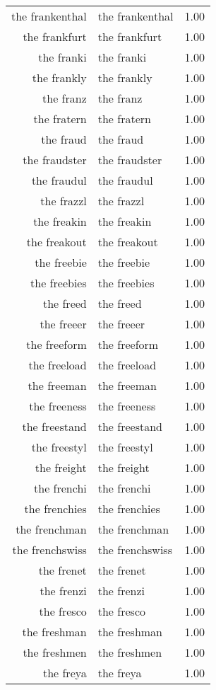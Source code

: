\begin{table}[ht]
\begin{tabular}{rlr}
  the frankenthal & the frankenthal & 1.00 \\ 
  the frankfurt & the frankfurt & 1.00 \\ 
  the franki & the franki & 1.00 \\ 
  the frankly & the frankly & 1.00 \\ 
  the franz & the franz & 1.00 \\ 
  the fratern & the fratern & 1.00 \\ 
  the fraud & the fraud & 1.00 \\ 
  the fraudster & the fraudster & 1.00 \\ 
  the fraudul & the fraudul & 1.00 \\ 
  the frazzl & the frazzl & 1.00 \\ 
  the freakin & the freakin & 1.00 \\ 
  the freakout & the freakout & 1.00 \\ 
  the freebie & the freebie & 1.00 \\ 
  the freebies & the freebies & 1.00 \\ 
  the freed & the freed & 1.00 \\ 
  the freeer & the freeer & 1.00 \\ 
  the freeform & the freeform & 1.00 \\ 
  the freeload & the freeload & 1.00 \\ 
  the freeman & the freeman & 1.00 \\ 
  the freeness & the freeness & 1.00 \\ 
  the freestand & the freestand & 1.00 \\ 
  the freestyl & the freestyl & 1.00 \\ 
  the freight & the freight & 1.00 \\ 
  the frenchi & the frenchi & 1.00 \\ 
  the frenchies & the frenchies & 1.00 \\ 
  the frenchman & the frenchman & 1.00 \\ 
  the frenchswiss & the frenchswiss & 1.00 \\ 
  the frenet & the frenet & 1.00 \\ 
  the frenzi & the frenzi & 1.00 \\ 
  the fresco & the fresco & 1.00 \\ 
  the freshman & the freshman & 1.00 \\ 
  the freshmen & the freshmen & 1.00 \\ 
  the freya & the freya & 1.00 \\ 

\end{tabular}
\end{table}
